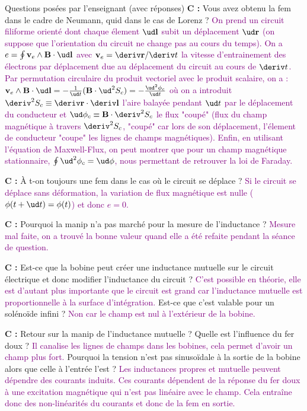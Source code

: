 \begin{reportBlock}{Questions posées par l’enseignant (avec réponses)}
  \textbf{C :} Vous avez obtenu la fem dans le cadre de Neumann, quid dans le cas de Lorenz ? \textcolor{purple}{On prend un circuit filiforme orienté dont chaque élement $\ud \mathbf l$ subit un déplacement $\ud \mathbf r$ (on suppose que l'orientation du circuit ne change pas au cours du temps). On a $e = \oint \mathbf{v}_e\land\mathbf{B} \cdot \ud \mathbf l$ avec $\mathbf{v}_e = \deriv \mathbf{r}/\deriv t$ la vitesse d'entrainement des électrons par déplacement due au déplacement du circuit au cours de $\deriv t$. Par permutation circulaire du produit vectoriel avec le produit scalaire, on a : $\mathbf{v}_e\land\mathbf{B} \cdot \ud \mathbf l = - \frac{1}{\ud t} (\mathbf{B} \cdot \ud^2 S_c) = - \frac{\ud^2 \phi_c}{\ud t}$ où on a introduit $\deriv^2 S_c \equiv \deriv \mathbf{r} \cdot \deriv \mathbf l$ l'aire balayée pendant $\ud t$ par le déplacement du conducteur et $\ud \phi_c \equiv \mathbf B \cdot \deriv^2 S_c$ le flux "coupé" (flux du champ magnétique à travers $\deriv^2 S_c$, "coupé" car lors de son déplacement, l'élement de conducteur "coupe" les lignes de champs magnétiques). Enfin, en utilisant l'équation de Maxwell-Flux, on peut montrer que pour un champ magnétique stationnaire, $\oint \ud^2 \phi_c = \ud \phi$, nous permettant de retrouver la loi de Faraday.} \newline
  
  \textbf{C :} \`{A} t-on toujours une fem dans le cas où le circuit se déplace ? \textcolor{purple}{Si le circuit se déplace sans déformation, la variation de flux magnétique est nulle ($\phi(t+\ud t) = \phi(t)$) et donc $e=0$.}\newline
  
  \textbf{C :} Pourquoi la manip n'a pas marché pour la mesure de l'inductance ? \textcolor{purple}{Mesure mal faite, on a trouvé la bonne valeur quand elle a été refaite pendant la séance de question.}  \newline
  
  \textbf{C :} Est-ce que la bobine peut créer une inductance mutuelle sur le circuit électrique et donc modifier l'inductance du circuit ? \textcolor{purple}{C'est possible en théorie, elle est d'autant plus importante que le circuit est grand car l'inductance mutuelle est proportionnelle à la surface d'intégration.} Est-ce que c'est valable pour un solénoïde infini ? \textcolor{purple}{Non car le champ est nul à l'extérieur de la bobine.}\newline
  
  \textbf{C :} Retour sur la manip de l'inductance mutuelle ? Quelle est l'influence du fer doux ? \textcolor{purple}{Il canalise les lignes de champs dans les bobines, cela permet d'avoir un champ plus fort.} Pourquoi la tension n'est pas sinusoïdale à la sortie de la bobine alors que celle à l'entrée l'est ? \textcolor{purple}{Les inductances propres et mutuelle peuvent dépendre des courants induits. Ces courants dépendent de la réponse du fer doux à une excitation magnétique qui n'est pas linéaire avec le champ. Cela entraîne donc des non-linéarités du courants et donc de la fem en sortie.}\newline
  

\end{reportBlock}
